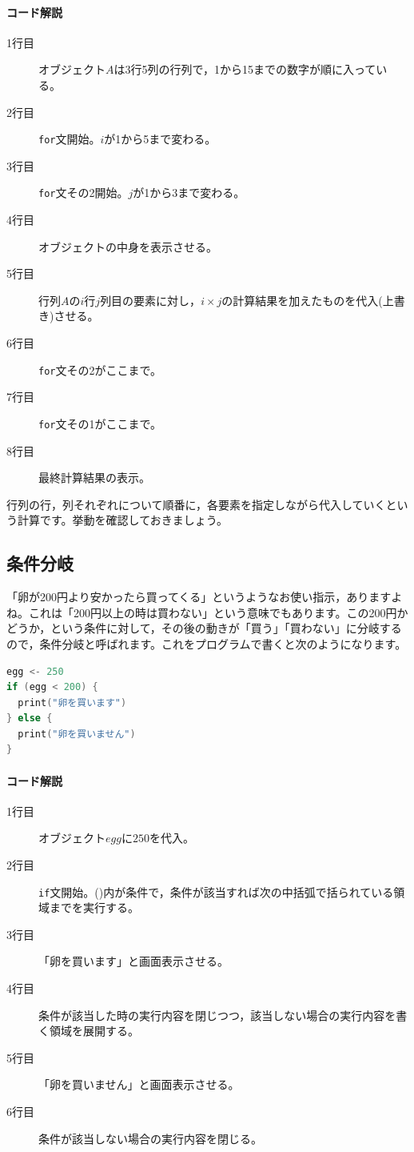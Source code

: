 \documentclass{ltjsbook}
\begin{document}
\paragraph{コード解説}
\begin{description}
	\item[1行目] オブジェクト$A$は3行5列の行列で，1から15までの数字が順に入っている。
	\item[2行目] \texttt{for}文開始。$i$が1から5まで変わる。
	\item[3行目] \texttt{for}文その2開始。$j$が1から3まで変わる。
	\item[4行目] オブジェクトの中身を表示させる。
	\item[5行目] 行列$A$の$i$行$j$列目の要素に対し，$i\times j$の計算結果を加えたものを代入(上書き)させる。
	\item[6行目] \texttt{for}文その2がここまで。
	\item[7行目] \texttt{for}文その1がここまで。
	\item[8行目] 最終計算結果の表示。
\end{description}

行列の行，列それぞれについて順番に，各要素を指定しながら代入していくという計算です。挙動を確認しておきましょう。

\subsection{条件分岐}
\label{if_statement}
「卵が200円より安かったら買ってくる」というようなお使い指示，ありますよね。これは「200円以上の時は買わない」という意味でもあります。この200円かどうか，という条件に対して，その後の動きが「買う」「買わない」に分岐するので，条件分岐と呼ばれます。これをプログラムで書くと次のようになります。
\begin{lstlisting}[language=c++,label={code:16_04},caption={条件分岐}]
egg <- 250
if (egg < 200) {
  print("卵を買います")
} else {
  print("卵を買いません")
}
\end{lstlisting}
\paragraph{コード解説}
\begin{description}
	\item[1行目] オブジェクト$egg$に$250$を代入。
	\item[2行目] \texttt{if}文開始。()内が条件で，条件が該当すれば次の中括弧で括られている領域までを実行する。
	\item[3行目] 「卵を買います」と画面表示させる。
	\item[4行目] 条件が該当した時の実行内容を閉じつつ，該当しない場合の実行内容を書く領域を展開する。
	\item[5行目] 「卵を買いません」と画面表示させる。
	\item[6行目] 条件が該当しない場合の実行内容を閉じる。
\end{description}
\end{document}
